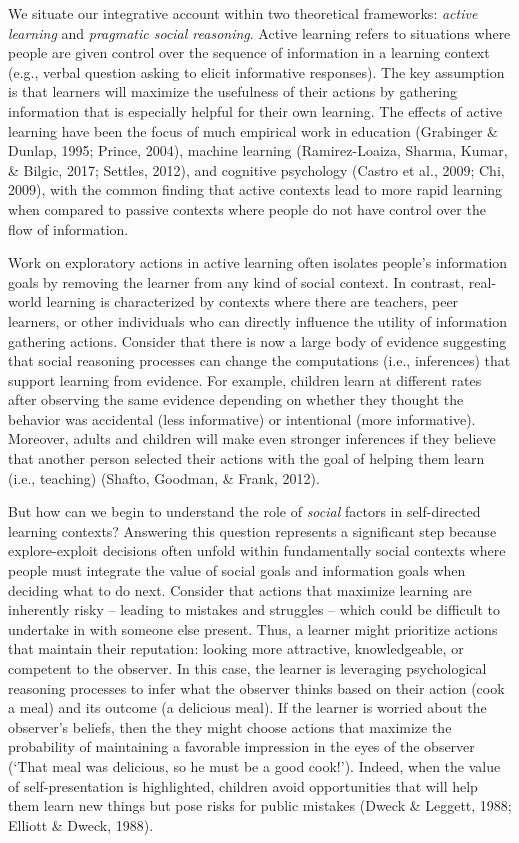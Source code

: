\documentclass[10pt, letterpaper]{article}
\begin{document}
We situate our integrative account within two theoretical frameworks:
\emph{active learning} and \emph{pragmatic social reasoning}. Active
learning refers to situations where people are given control over the
sequence of information in a learning context (e.g., verbal question
asking to elicit informative responses). The key assumption is that
learners will maximize the usefulness of their actions by gathering
information that is especially helpful for their own learning. The
effects of active learning have been the focus of much empirical work in
education (Grabinger \& Dunlap, 1995; Prince, 2004), machine learning
(Ramirez-Loaiza, Sharma, Kumar, \& Bilgic, 2017; Settles, 2012), and
cognitive psychology (Castro et al., 2009; Chi, 2009), with the common
finding that active contexts lead to more rapid learning when compared
to passive contexts where people do not have control over the flow of
information.

Work on exploratory actions in active learning often isolates people's
information goals by removing the learner from any kind of social
context. In contrast, real-world learning is characterized by contexts
where there are teachers, peer learners, or other individuals who can
directly influence the utility of information gathering actions.
Consider that there is now a large body of evidence suggesting that
social reasoning processes can change the computations (i.e.,
inferences) that support learning from evidence. For example, children
learn at different rates after observing the same evidence depending on
whether they thought the behavior was accidental (less informative) or
intentional (more informative). Moreover, adults and children will make
even stronger inferences if they believe that another person selected
their actions with the goal of helping them learn (i.e., teaching)
(Shafto, Goodman, \& Frank, 2012).

But how can we begin to understand the role of \emph{social} factors in
self-directed learning contexts? Answering this question represents a
significant step because explore-exploit decisions often unfold within
fundamentally social contexts where people must integrate the value of
social goals and information goals when deciding what to do next.
Consider that actions that maximize learning are inherently risky --
leading to mistakes and struggles -- which could be difficult to
undertake in with someone else present. Thus, a learner might prioritize
actions that maintain their reputation: looking more attractive,
knowledgeable, or competent to the observer. In this case, the learner
is leveraging psychological reasoning processes to infer what the
observer thinks based on their action (cook a meal) and its outcome (a
delicious meal). If the learner is worried about the observer's beliefs,
then the they might choose actions that maximize the probability of
maintaining a favorable impression in the eyes of the observer (`That
meal was delicious, so he must be a good cook!'). Indeed, when the value
of self-presentation is highlighted, children avoid opportunities that
will help them learn new things but pose risks for public mistakes
(Dweck \& Leggett, 1988; Elliott \& Dweck, 1988).
\end{document}
